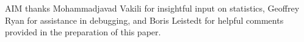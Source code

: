 \documentclass[iop]{emulateapj}
\begin{document}
%
%
%
%
%
%


\begin{acknowledgements}
AIM thanks Mohammadjavad Vakili for insightful input on statistics, Geoffrey Ryan for assistance in debugging, and Boris Leistedt for helpful comments provided in the preparation of this paper.
\end{acknowledgements}

%
%
\end{document}
